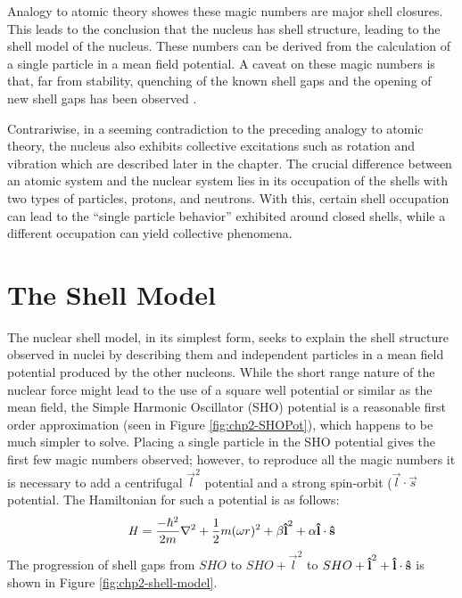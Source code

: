 Analogy to atomic theory showes these magic numbers are major shell closures. This leads to the conclusion that the nucleus has shell structure, leading to the shell model of the nucleus. These numbers can be derived from the calculation of a single particle in a mean field potential. A caveat on these magic numbers is that, far from stability, quenching of the known shell gaps and the opening of new shell gaps has been observed \cite{changingShells}.

Contrariwise, in a seeming contradiction to the preceding analogy to atomic theory, the nucleus also exhibits collective excitations such as rotation and vibration which are described later in the chapter. The crucial difference between an atomic system and the nuclear system lies in its occupation of the shells with two types of particles, protons, and neutrons. With this, certain shell occupation can lead to the ``single particle behavior'' exhibited around closed shells, while a different occupation can yield collective phenomena.

\section{The Shell Model}
\label{sec:models-shell-model}
The nuclear shell model, in its simplest form, seeks to explain the shell structure observed in nuclei by describing them and independent particles in a mean field potential produced by the other nucleons. While the short range nature of the nuclear force might lead to the use of a square well potential or similar as the mean field, the Simple Harmonic Oscillator (SHO) potential is a reasonable first order approximation (seen in Figure \ref{fig:chp2-SHOPot}), which happens to be much simpler to solve. Placing a single particle in the SHO potential gives the first few magic numbers observed; however, to reproduce all the magic numbers it is necessary to add a centrifugal $\vec{l}^2$ potential and a strong spin-orbit ($\vec{l}\cdot\vec{s}$ potential. The Hamiltonian for such a potential is as follows:
\begin{equation}
\label{eqn:chp2-sm-sho-hamil}
\mathbf{\mathit{H}} = \frac{-\hbar^2}{2m}\nabla^2 + \frac{1}{2}m(\omega r)^2 + \beta \boldsymbol{\hat{\textbf{l}}}^2 + \alpha \boldsymbol{\hat{\textbf{l}}}\cdot{}\boldsymbol{\hat{\textbf{s}}}
\end{equation}
The progression of shell gaps from $SHO$ to $SHO + \vec{l}^2$ to $SHO + \boldsymbol{\hat{\textbf{l}}}^2 + \boldsymbol{\hat{\textbf{l}}}\cdot\boldsymbol{\hat{\textbf{s}}}$ is shown in Figure \ref{fig:chp2-shell-model}.

